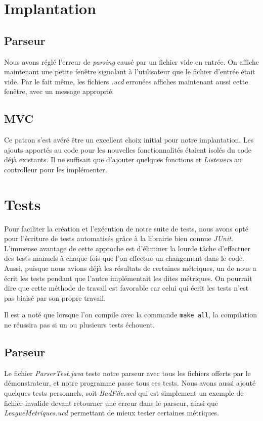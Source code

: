 \documentclass[letter,french]{report}
\begin{document}
	\section*{Implantation}
	
	\subsection*{Parseur}
  Nous avons réglé l'erreur de \emph{parsing} causé par un fichier vide en
  entrée. On affiche maintenant une petite fenêtre signalant à l'utilisateur que
  le fichier d'entrée était vide. Par le fait même, les fichiers \emph{.ucd}
  erronées affiches maintenant aussi cette fenêtre, avec un message approprié.
	
	\subsection*{MVC}
  Ce patron s'est avéré être un excellent choix initial pour notre implantation.
  Les ajouts apportés au code pour les nouvelles fonctionnalités étaient isolés
  du code déjà existants. Il ne suffisait que d'ajouter quelques fonctions et
  \emph{Listeners} au controlleur pour les implémenter.
	
	\section*{Tests}
  Pour faciliter la création et l'exécution de notre suite de tests, nous avons opté pour
  l'écriture de tests automatisés grâce à la librairie bien connue \emph{JUnit}.
  L'immense avantage de cette approche est d'éliminer la lourde tâche
  d'effectuer des tests manuels à chaque fois que l'on effectue un changement
  dans le code. Aussi, puisque nous avions déjà les résultats de certaines
  métriques, un de nous a écrit les tests pendant que l'autre implémentait les
  dites métriques. On pourrait dire que cette méthode de travail est favorable
  car celui qui écrit les tests n'est pas biaisé par son propre travail.

  Il est a noté que lorsque l'on compile avec la commande \texttt{make all}, la
  compilation ne réussira pas si un ou plusieurs tests échouent. 

  \subsection*{Parseur}
  Le fichier \emph{ParserTest.java} teste notre parseur avec tous les fichiers
  offerts par le démonstrateur, et notre programme passe tous ces tests. Nous
  avons aussi ajouté quelques tests personnels, soit \emph{BadFile.ucd} qui est
  simplement un exemple de fichier invalide devant retourner une erreur dans le
  parseur, ainsi que \emph{LeagueMetriques.ucd} permettant de mieux tester
  certaines métriques.
\end{document}
